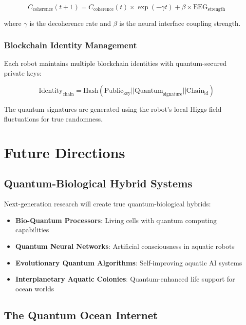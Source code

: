 \documentclass[11pt,a4paper]{article}
\begin{document}
\begin{equation}
C_{\text{coherence}}(t+1) = C_{\text{coherence}}(t) \times \exp(-\gamma t) + \beta \times \text{EEG}_{\text{strength}}
\end{equation}

where $\gamma$ is the decoherence rate and $\beta$ is the neural interface coupling strength.

\subsubsection{Blockchain Identity Management}
Each robot maintains multiple blockchain identities with quantum-secured private keys:

\begin{equation}
\text{Identity}_{\text{chain}} = \text{Hash}(\text{Public}_{\text{key}} || \text{Quantum}_{\text{signature}} || \text{Chain}_{\text{id}})
\end{equation}

The quantum signatures are generated using the robot's local Higgs field fluctuations for true randomness.

\section{Future Directions}

\subsection{Quantum-Biological Hybrid Systems}

Next-generation research will create true quantum-biological hybrids:

\begin{itemize}
    \item \textbf{Bio-Quantum Processors}: Living cells with quantum computing capabilities
    \item \textbf{Quantum Neural Networks}: Artificial consciousness in aquatic robots
    \item \textbf{Evolutionary Quantum Algorithms}: Self-improving aquatic AI systems
    \item \textbf{Interplanetary Aquatic Colonies}: Quantum-enhanced life support for ocean worlds
\end{itemize}

\subsection{The Quantum Ocean Internet}
\end{document}
